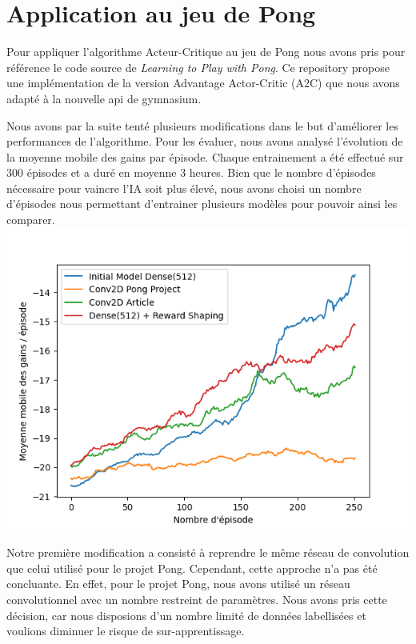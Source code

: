 \section{Application au jeu de Pong}

Pour appliquer l'algorithme Acteur-Critique au jeu de Pong nous avons pris pour référence le code source
de \emph{Learning to Play with Pong}\cite{PongGithub}. Ce repository propose une implémentation de la version Advantage Actor-Critic (A2C)
que nous avons adapté à la nouvelle api de gymnasium.

Nous avons par la suite tenté plusieurs modifications dans le but d'améliorer les performances de l'algorithme.
Pour les évaluer, nous avons analysé l'évolution de la moyenne mobile des gains par épisode.
Chaque entrainement a été effectué sur 300 épisodes et a duré en moyenne 3 heures. Bien que le nombre d'épisodes nécessaire
pour vaincre l'IA soit plus élevé, nous avons choisi  un nombre d'épisodes nous permettant d'entrainer plusieurs modèles pour pouvoir ainsi les comparer.
\includegraphics[width=\linewidth]{rolling_average_graph.png}

\par Notre première modification a consisté à reprendre le même réseau de convolution que celui utilisé pour le projet Pong. 
Cependant, cette approche n'a pas été concluante. 
En effet, pour le projet Pong, nous avons utilisé un réseau convolutionnel avec un nombre restreint de 
paramètres. Nous avons pris cette décision, car nous disposions d'un nombre limité de données labellisées 
et voulions diminuer le risque de sur-apprentissage. 

